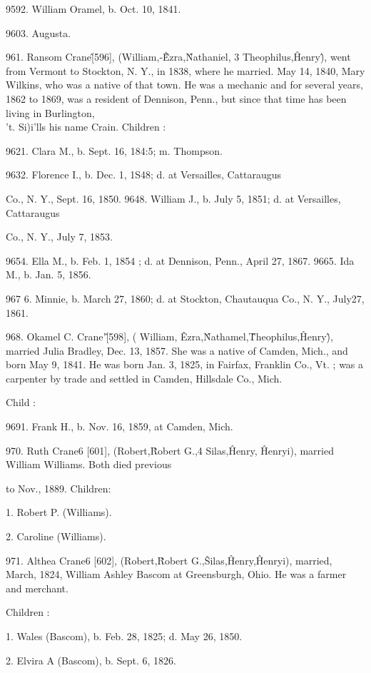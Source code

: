 9592. William Oramel, b. Oct. 10, 1841. 

9603. Augusta. 

961. Ransom Crane\^ [596], (William,-\^\^ Ezra,\^ Nathaniel, 3 
Theophilus,\^ Henry\^), went from Vermont to Stockton, N. Y., 
in 1838, where he married. May 14, 1840, Mary Wilkins, who 
was a native of that town. He was a mechanic and for several 
years, 1862 to 1869, was a resident of Dennison, Penn., but 
since that time has been living in Burlington, \\'t. Si)i'lls his 
name Crain. Children : 

9621. Clara M., b. Sept. 16, 184:5; m. Thompson. 

9632. Florence I., b. Dec. 1, 1S48; d. at Versailles, Cattaraugus 

Co., N. Y., Sept. 16, 1850. 
9648. William J., b. July 5, 1851; d. at Versailles, Cattaraugus 

Co., N. Y., July 7, 1853. 




9654. Ella M., b. Feb. 1, 1854 ; d. at Dennison, Penn., April 27, 1867. 
9665. Ida M., b. Jan. 5, 1856. 

967  6. Minnie, b. March 27, 1860; d. at Stockton, Chautauqua Co., 
N. Y., July27, 1861. 

968. Okamel C. Crane'\^ [598], ( William, \^ Ezra,\^ Nathamel,\^ 
Theophilus,\^ Henry\^), married Julia Bradley, Dec. 13, 1857. 
She was a native of Camden, Mich., and born May 9, 1841. He 
was born Jan. 3, 1825, in Fairfax, Franklin Co., Vt. ; was a 
carpenter by trade and settled in Camden, Hillsdale Co., Mich. 

Child : 

9691. Frank H., b. Nov. 16, 1859, at Camden, Mich. 

970. Ruth Crane6 [601], (Robert,\^ Robert G.,4 Silas,\^ 
Henry, \^ Henryi), married William Williams. Both died previous 

to Nov., 1889. Children: 

1. Robert P. (Williams). 

2. Caroline (Williams). 

971. Althea Crane6 [602], (Robert,\^ Robert G.,\^ Silas,\^ 
Henry,\^ Henryi), married, March, 1824, William Ashley Bascom 
at Greensburgh, Ohio. He was a farmer and merchant. 

Children : 

1. Wales (Bascom), b. Feb. 28, 1825; d. May 26, 1850. 

2. Elvira A (Bascom), b. Sept. 6, 1826. 

